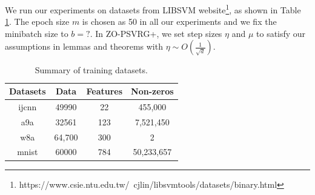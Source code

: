 \documentclass{article}
\theoremstyle{definition}
\theoremstyle{remark}
\begin{document}
We run our experiments on datasets from LIBSVM website{\footnote{https://www.csie.ntu.edu.tw/~cjlin/libsvmtools/datasets/binary.html}}, as shown in Table \ref{metadata}. The epoch size $m$ is chosen as {\color{red} 50} in all our experiments and we fix the minibatch size to $b = ?$. In ZO-PSVRG+, we set step sizes $\eta$ and $\mu$ to satisfy our assumptions in lemmas and theorems with $\eta\sim O(\frac{1}{\sqrt{d}})$.

\begin{table}[htbp]
\begin{center}
\caption{Summary of training datasets.}
\begin{tabular}{ c|c|c|c } 
 \hline
 Datasets &  Data & Features & Non-zeros \\ 
 \hline
  ijcnn & 49990 & 22 &  455,000\\
  a9a & 32561 & 123 & 7,521,450\\ 
 w8a & 64,700  & 300 & 2 \\ 
 mnist & 60000 & 784 &  50,233,657\\
 \hline
\end{tabular}
\label{metadata}
\end{center}
\end{table}
\end{document}
